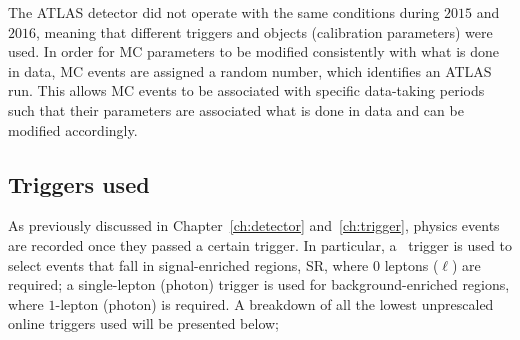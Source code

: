 		The \ac{ATLAS} detector did not operate with the same conditions during $2015$ and $2016$, meaning that different triggers and objects (calibration parameters) were used. In order for \ac{MC} parameters to be modified consistently with what is done in data, \ac{MC} events are assigned a random number, which identifies an ATLAS run. This allows \ac{MC} events to be associated with specific data-taking periods such that their parameters are associated what is done in data and can be modified accordingly.

		\subsection{Triggers used}

			As previously discussed in Chapter~\ref{ch:detector} and~\ref{ch:trigger}, physics events are recorded once they passed a certain trigger. In particular, a \met\ trigger is used to select events that fall in signal-enriched regions, \ac{SR}, where $0$ leptons ($\ell$) are required; a single-lepton (photon) trigger is used for background-enriched regions, where $1$-lepton (photon) is required. A breakdown of all the lowest unprescaled online triggers used will be presented below;

